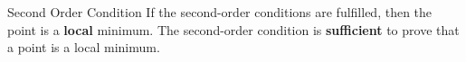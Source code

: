 \begin{vbframe}{Second Order Condition}
  If the second-order conditions are fulfilled, then the point is a \textbf{local} minimum. The second-order condition is \textbf{sufficient} to prove that a point is a local minimum. 
  
  
  
  
  \end{vbframe}
  
  \endlecture
  
  
  
  